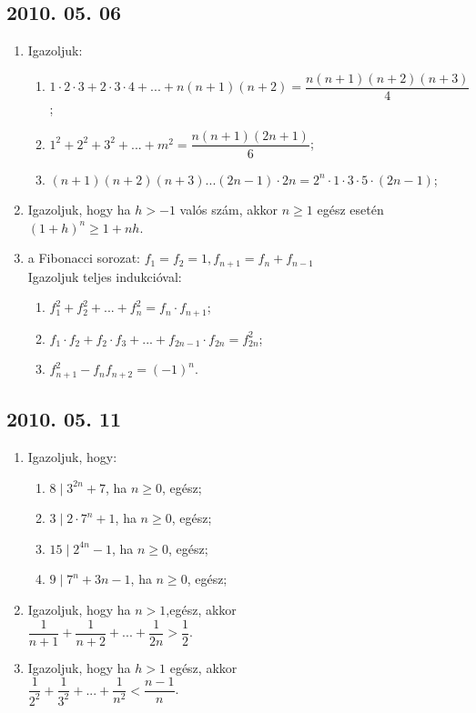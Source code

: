 \documentclass{article}
\newenvironment{abc}{\begin{enumerate}[label=\textit{\alph*})]}{\end{enumerate}}
\begin{document}
\subsection*{2010. 05. 06}
\begin{enumerate}
\item Igazoljuk:
\begin{abc}
\item $1\cdot2\cdot3+2\cdot3\cdot4+...+n(n+1)(n+2)=\dfrac{n(n+1)(n+2)(n+3)}{4}$;
\item $1^{2}+2^{2}+3^{2}+...+m^{2}=\dfrac{n(n+1)(2n+1)}{6}$;
\item $(n+1)(n+2)(n+3)...(2n-1)\cdot2n=2^{n}\cdot1\cdot3\cdot5\cdot(2n-1)$;
\end{abc}
\item Igazoljuk, hogy ha $h>-1$ valós szám, akkor $n\ge1$ egész esetén $(1+h)^{n}\ge1+nh$.
\item a Fibonacci sorozat: $f_{1}=f_{2}=1,  f_{n+1}=f_{n}+f_{n-1}$\\
Igazoljuk teljes indukcióval:
\begin{abc}
\item $f_{1}^{2}+f_{2}^{2}+...+f_{n}^{2}=f_{n}\cdot f_{n+1}$;
\item $f_{1}\cdot f_{2}+f_{2}\cdot f_{3}+...+f_{2n-1}\cdot f_{2n}=f_{2n}^{2}$;
\item $f_{n+1}^{2}-f_{n}f_{n+2}=(-1)^{n}$.
\end{abc}
\end{enumerate}


\subsection*{2010. 05. 11}
\begin{enumerate}
\item Igazoljuk, hogy:
\begin{abc}
\item $8\mid 3^{2n}+7$, ha $n\ge0$, egész;
\item $3\mid 2\cdot7^{n}+1$, ha $n\ge0$, egész;
\item $15\mid 2^{4n}-1$, ha $n\ge0$, egész;
\item $9\mid 7^{n}+3n-1$, ha $n\ge0$, egész;
\end{abc}
\item Igazoljuk, hogy ha $n>1$,egész, akkor\\
$\dfrac{1}{n+1}+\dfrac{1}{n+2}+...+\dfrac{1}{2n}>\dfrac{1}{2}$.
\item Igazoljuk, hogy ha $h>1$ egész, akkor\\
$\dfrac{1}{2^{2}}+\dfrac{1}{3^{2}}+...+\dfrac{1}{n^{2}}<\dfrac{n-1}{n}$.
\end{enumerate}
\end{document}
